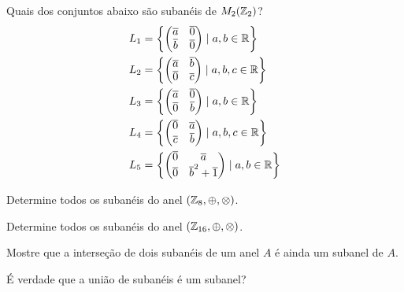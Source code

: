 \documentclass[12pt]{exam}
\begin{document}
\questao{} Quais dos conjuntos abaixo s\~ao suban\'eis de $M_2(\mathbb{Z}_2)$?
\begin{align*}
	L_1 &= \left\{\begin{pmatrix}
		\overline{a} & \overline{0}\\
		\overline{b} & \overline{0}
	\end{pmatrix} \mid a, b \in \mathbb{R}\right\}\\
	L_2 &= \left\{\begin{pmatrix}
		\overline{a} & \overline{b}\\
		\overline{0} & \overline{c}
	\end{pmatrix} \mid a, b, c \in \mathbb{R}\right\}\\
	L_3 &= \left\{\begin{pmatrix}
		\overline{a} & \overline{0}\\
		\overline{0} & \overline{b}
	\end{pmatrix} \mid a, b \in \mathbb{R}\right\}\\
	L_4 &= \left\{\begin{pmatrix}
		\overline{0} & \overline{a}\\
		\overline{c} & \overline{b}
	\end{pmatrix} \mid a, b, c \in \mathbb{R}\right\}\\
	L_5 &= \left\{\begin{pmatrix}
		\overline{0} & \overline{a}\\
		\overline{0} & \overline{b}^2 + \overline{1}
	\end{pmatrix} \mid a, b \in \mathbb{R}\right\}
\end{align*}

\vspace{.3cm}

\questao{} Determine todos os suban\'eis do anel $(\mathbb{Z}_8, \oplus, \otimes)$.

\vspace{.3cm}

\questao{} Determine todos os suban\'eis do anel $(\mathbb{Z}_{16}, \oplus, \otimes)$.

\vspace{.3cm}

\questao{} Mostre que a interse\c{c}\~ao de dois suban\'eis de um anel $A$ \'e ainda um subanel de $A$.

\vspace{.3cm}

\questao{} É verdade que a união de subanéis é um subanel?

\vspace{.3cm}
\end{document}
